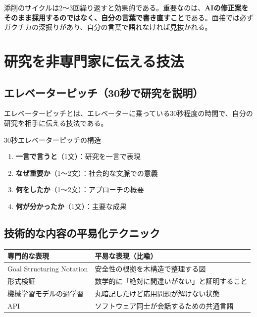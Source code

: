 添削のサイクルは2〜3回繰り返すと効果的である。重要なのは、\textbf{AIの修正案をそのまま採用するのではなく、自分の言葉で書き直すこと}である。面接では必ずガクチカの深掘りがあり、自分の言葉で語れなければ見抜かれる。

\section{研究を非専門家に伝える技法}

\subsection*{エレベーターピッチ（30秒で研究を説明）}

エレベーターピッチとは、エレベーターに乗っている30秒程度の時間で、自分の研究を相手に伝える技法である。

\begin{itembox}[l]{30秒エレベーターピッチの構造}
\begin{enumerate}
\item \textbf{一言で言うと}（1文）：研究を一言で表現
\item \textbf{なぜ重要か}（1〜2文）：社会的な文脈での意義
\item \textbf{何をしたか}（1〜2文）：アプローチの概要
\item \textbf{何が分かったか}（1文）：主要な成果
\end{enumerate}
\end{itembox}

\subsection*{技術的な内容の平易化テクニック}

\begin{table}[H]
\centering
\footnotesize
\begin{tabular}{lp{}}
\toprule
専門的な表現 & 平易な表現（比喩） \\
\midrule
Goal Structuring Notation & 安全性の根拠を木構造で整理する図 \\
形式検証 & 数学的に「絶対に間違いがない」と証明すること \\
機械学習モデルの過学習 & 丸暗記したけど応用問題が解けない状態 \\
API & ソフトウェア同士が会話するための共通言語 \\
\bottomrule
\end{tabular}
\end{table}


